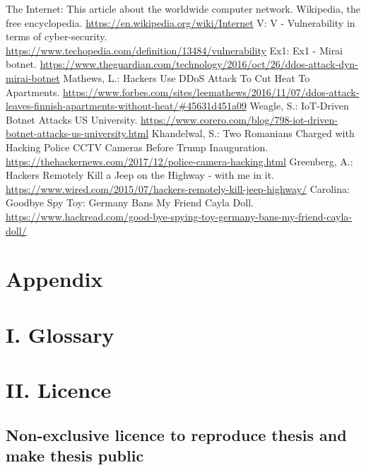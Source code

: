 \documentclass[12pt]{article}
\begin{document}
\begin{thebibliography}{9}
	The Internet: This article about the worldwide computer network. 
	 Wikipedia, the free encyclopedia.
	\url{https://en.wikipedia.org/wiki/Internet}
	V: V - Vulnerability in terms of cyber-security.
	\url{https://www.techopedia.com/definition/13484/vulnerability} 
	 Ex1: Ex1 - Mirai botnet.
	 \url{https://www.theguardian.com/technology/2016/oct/26/ddos-attack-dyn-mirai-botnet}
	Mathews, L.: Hackers Use DDoS Attack To Cut Heat To Apartments.
	\url{https://www.forbes.com/sites/leemathews/2016/11/07/ddos-attack-leaves-finnish-apartments-without-heat/#45631d451a09}
	Weagle, S.: IoT-Driven Botnet Attacks US University.
	\url{https://www.corero.com/blog/798-iot-driven-botnet-attacks-us-university.html}
	Khandelwal, S.: Two Romanians Charged with Hacking Police CCTV Cameras Before Trump Inauguration.
	\url{https://thehackernews.com/2017/12/police-camera-hacking.html}
	Greenberg, A.: Hackers Remotely Kill a Jeep on the Highway - with me in it.
	\url{https://www.wired.com/2015/07/hackers-remotely-kill-jeep-highway/}
	Carolina: Goodbye Spy Toy: Germany Bans My Friend Cayla Doll.
	\url{https://www.hackread.com/good-bye-spying-toy-germany-bans-my-friend-cayla-doll/}
\end{thebibliography}


\newpage
%
  {\section*{Appendix}
  }


\section*{I. Glossary}

\newpage


\section*{II. Licence}


\subsection*{Non-exclusive licence to reproduce thesis and make thesis public}
\end{document}
